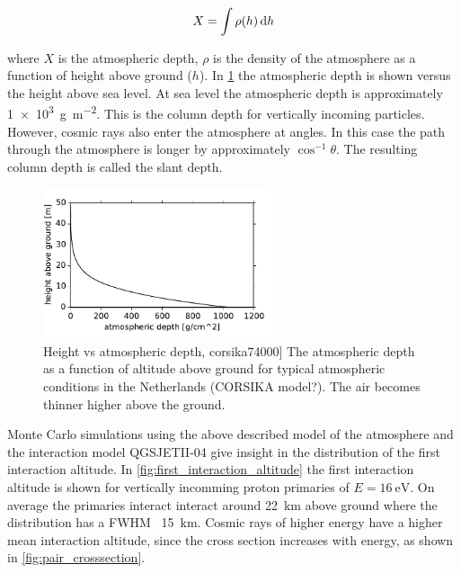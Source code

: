 \begin{equation}
    X = \int \rho(h) \mathop{}\!\mathrm{d} h
\end{equation}

where $X$ is the atmospheric depth, $\rho$ is the density of the atmosphere as a function of height above ground ($h$). In \cref{fig:atmospheric_depth} the atmospheric depth is shown versus the height above sea level. At sea level the atmospheric depth is approximately \SI{1e3}{\gram\per\meter\squared}. This is the column depth for vertically incoming particles. However, cosmic rays also enter the atmosphere at angles. In this case the path through the atmosphere is longer by approximately $\cos^{-1} \theta$. The resulting column depth is called the slant depth.

\begin{figure}
    \centering
    \includegraphics[width=0.6\textwidth]
                    {plots/cosmic-rays/atmospheric_depth}
    \caption{Height vs atmospheric depth, corsika74000]
The atmospheric depth as a function of altitude above ground for typical atmospheric conditions in the Netherlands (CORSIKA model?). The air becomes thinner higher above the ground.}
    \label{fig:atmospheric_depth}
\end{figure}

Monte Carlo simulations using the above described model of the atmosphere and the interaction model QGSJETII-04 give insight in the distribution of the first interaction altitude. In \cref{fig:first_interaction_altitude} the first interaction altitude is shown for vertically incomming proton primaries of $E = \SI{16}{\eV}$. On average the primaries interact interact around \SI{22}{\kilo\meter} above ground where the distribution has a FWHM ~\SI{15}{\kilo\meter}. Cosmic rays of higher energy have a higher mean interaction altitude, since the cross section increases with energy, as shown in \cref{fig:pair_crosssection}.

